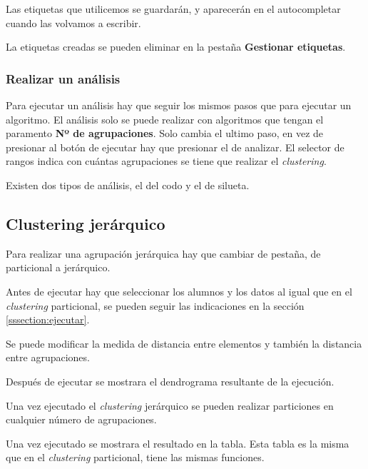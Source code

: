 Las etiquetas que utilicemos se guardarán, y aparecerán en el autocompletar cuando las volvamos a escribir.

La etiquetas creadas se pueden eliminar en la pestaña \textbf{Gestionar etiquetas}.

\subsubsection{Realizar un análisis}
Para ejecutar un análisis hay que seguir los mismos pasos que para ejecutar un algoritmo. El análisis solo se puede realizar con algoritmos que tengan el paramento \textbf{Nº de agrupaciones}. Solo cambia el ultimo paso, en vez de presionar al botón de ejecutar hay que presionar el de analizar. El selector de rangos indica con cuántas agrupaciones se tiene que realizar el \emph{clustering}. 

Existen dos tipos de análisis, el del codo y el de silueta.


\subsection{Clustering jerárquico}
Para realizar una agrupación jerárquica hay que cambiar de pestaña, de particional a jerárquico.

Antes de ejecutar hay que seleccionar los alumnos y los datos al igual que en el \emph{clustering} particional, se pueden seguir las indicaciones en la sección \ref{sssection:ejecutar}.

Se puede modificar la medida de distancia entre elementos y también la distancia entre agrupaciones.

Después de ejecutar se mostrara el dendrograma resultante de la ejecución.

Una vez ejecutado el \emph{clustering} jerárquico se pueden realizar particiones en cualquier número de agrupaciones.

Una vez ejecutado se mostrara el resultado en la tabla. Esta tabla es la misma que en el \emph{clustering} particional, tiene las mismas funciones.

